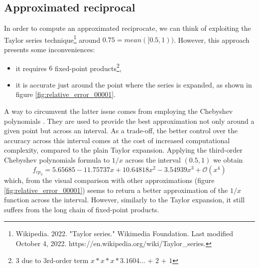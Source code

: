\subsection{Approximated reciprocal}

In order to compute an approximated reciprocate, we can think of exploiting the Taylor series technique\footnote{Wikipedia. 2022. "Taylor series." Wikimedia Foundation. Last modified October 4, 2022. https://en.wikipedia.org/wiki/Taylor\_series.} around $ 0.75 = mean([0.5, 1))$.
However, this approach presents some inconveniences:
\begin{itemize}
\item it requires $6$ fixed-point products\footnote{$3$ due to 3rd-order term $x*x*x*3.1604\dots$ + $2$ + $1$},
\item it is accurate just around the point where the series is expanded, as shown in figure \ref{fig:relative_error_00001}.
\end{itemize}
A way to circumvent the latter issue comes from employing the Chebyshev polynomials \cite{Hale2015}. They are used to provide the best approximation not only around a given point but across an interval.
As a trade-off, the better control over the accuracy across this interval comes at the cost of increased computational complexity, compared to the plain Taylor expansion.
Applying the third-order Chebyshev polynomials formula to $1/x$ across the interval $(0.5, 1)$ we obtain
\begin{equation}\label{equ:3rd_order_Chebyshev_polynomial_equation}
f_{cp_3} = 5.65685 - 11.75737x + 10.64818x^2 - 3.54939 x^3 + \mathcal{O}(x^4)
\end{equation}
which, from the visual comparison with other approximations (figure \ref{fig:relative_error_00001}) seems to return a better approximation of the $1/x$ function across the interval. However, similarly to the Taylor expansion, it still suffers from the long chain of fixed-point products.

